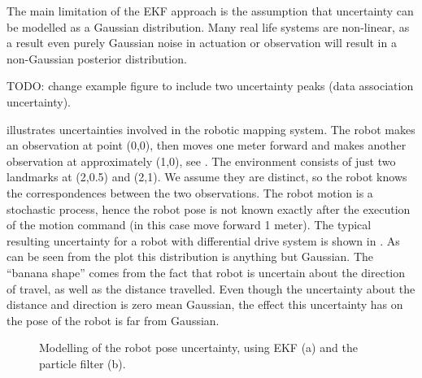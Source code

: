 The main limitation of the EKF approach is the assumption that
uncertainty can be modelled as a Gaussian distribution. Many real life
systems are non-linear, as a result even purely Gaussian noise in
actuation or observation will result in a non-Gaussian posterior
distribution.  

TODO: change example figure to include two uncertainty peaks (data
association uncertainty). 

 illustrates uncertainties involved in the 
robotic mapping system. The robot makes an observation at point (0,0),
then moves one meter forward and makes another observation at
approximately (1,0), see . The environment
consists of just two landmarks at (2,0.5) and (2,1). We assume they
are distinct, so the robot knows the correspondences between the two
observations. The robot motion is a stochastic process, hence the
robot pose is not known exactly after the execution of the motion
command (in this case move forward 1 meter). The typical resulting
uncertainty for a robot with differential drive system is shown in
. As can be seen from the plot  this 
distribution is anything but Gaussian. The ``banana shape'' comes from
the fact that robot is uncertain about the direction of travel, as
well as the distance travelled. Even though the uncertainty about
the distance and direction is zero mean Gaussian, the effect this
uncertainty has on the pose of the robot is far from Gaussian.

\begin{figure}
\begin{center}
\quad
{}
\end{center}

\caption[Comparison of uncertainty representation.]
{Modelling of the robot pose uncertainty,
 using EKF (a) and the particle filter (b).
}
\label{fig:post_ekf_vs_pf}
\end{figure}


